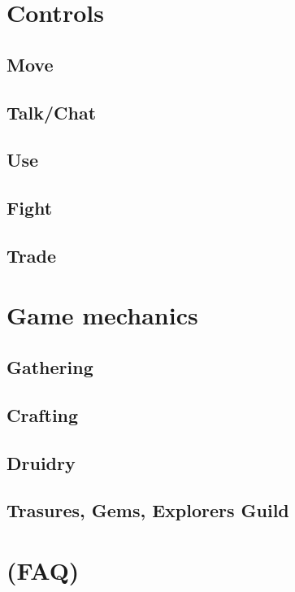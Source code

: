 \documentclass[a4paper,11pt]{scrreprt}
\begin{document}
\chapter{Controls}
\section{Move}
\section{Talk/Chat}
\section{Use}
\section{Fight}
\section{Trade}
\section{}

\chapter{Game mechanics}
\section{Gathering}
\section{Crafting}
\section{Druidry}
\section{Trasures, Gems, Explorers Guild}

\chapter{(FAQ)}
\end{document}
